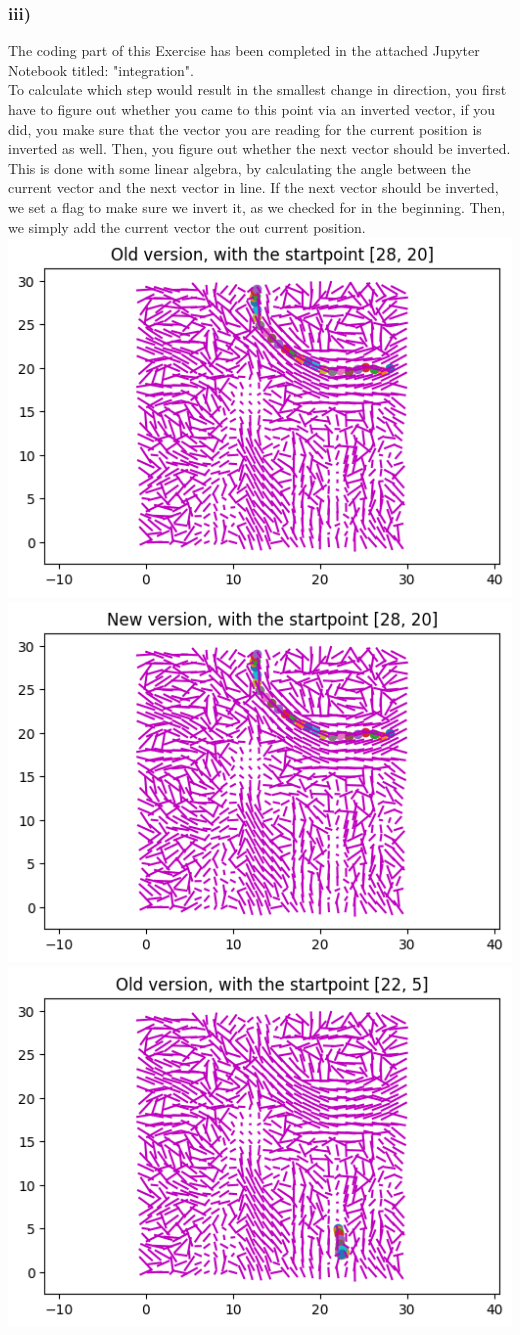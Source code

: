 \subsubsection{iii)}
The coding part of this Exercise has been completed in the attached Jupyter Notebook titled: "integration". \\
To calculate which step would result in the smallest change in direction, you first have to figure out whether you came to this point via an inverted vector, if you did, you make sure that the vector you are reading for the current position is inverted as well. Then, you figure out whether the next vector should be inverted. This is done with some linear algebra, by calculating the angle between the current vector and the next vector in line. If the next vector should be inverted, we set a flag to make sure we invert it, as we checked for in the beginning. Then, we simply add the current vector the out current position.\\
\includegraphics[width=0.5\linewidth]{old2820}
\includegraphics[width=0.5\linewidth]{new2820}
\includegraphics[width=0.5\linewidth]{old225}
